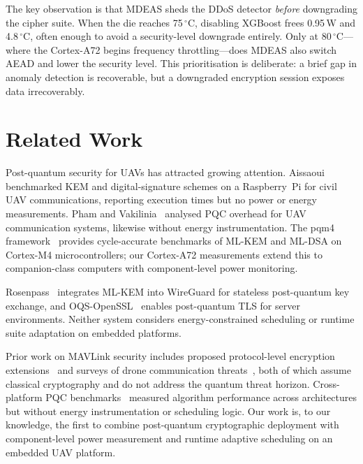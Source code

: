 \documentclass[conference]{IEEEtran}
\newcommand{\mdeas}{\textsc{MDEAS}}
\begin{document}
The key observation is that \mdeas{} sheds the DDoS detector
\emph{before} downgrading the cipher suite.  When the die
reaches 75\,$^\circ$C, disabling XGBoost frees 0.95\,W and
4.8\,$^\circ$C, often enough to avoid a security-level
downgrade entirely.  Only at 80\,$^\circ$C---where the Cortex-A72
begins frequency throttling---does \mdeas{} also switch AEAD and
lower the security level.  This prioritisation is deliberate:
a brief gap in anomaly detection is recoverable, but a downgraded
encryption session exposes data irrecoverably.


\section{Related Work}
\label{sec:related}

Post-quantum security for UAVs has attracted growing attention.
Aissaoui~\cite{aissaoui-drone} benchmarked KEM and digital-signature
schemes on a Raspberry~Pi for civil UAV communications, reporting
execution times but no power or energy measurements.
Pham and Vakilinia~\cite{drone-pqc-analysis} analysed PQC overhead
for UAV communication systems, likewise without energy
instrumentation.  The pqm4 framework~\cite{pqm4} provides
cycle-accurate benchmarks of ML-KEM and ML-DSA on Cortex-M4
microcontrollers; our Cortex-A72 measurements extend this to
companion-class computers with component-level power monitoring.

Rosenpass~\cite{rosenpass} integrates ML-KEM into WireGuard for
stateless post-quantum key exchange, and OQS-OpenSSL~\cite{liboqs}
enables post-quantum TLS for server environments.  Neither system
considers energy-constrained scheduling or runtime suite adaptation
on embedded platforms.

Prior work on MAVLink security includes proposed protocol-level
encryption extensions~\cite{mavlink-spec} and surveys of drone
communication threats~\cite{drone-security-survey}, both of which
assume classical cryptography and do not address the quantum threat
horizon.  Cross-platform PQC benchmarks~\cite{cross-platform-pqc}
measured algorithm performance across architectures but without
energy instrumentation or scheduling logic.  Our work is, to our
knowledge, the first to combine post-quantum cryptographic deployment
with component-level power measurement and runtime adaptive
scheduling on an embedded UAV platform.
\end{document}
